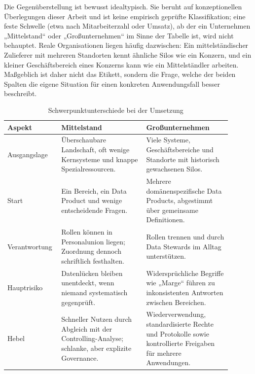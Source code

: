 \documentclass[a4paper,12pt]{article}
\theoremstyle{definition}
\begin{document}
Die Gegenüberstellung ist bewusst idealtypisch. Sie beruht auf konzeptionellen Überlegungen dieser Arbeit und ist keine empirisch geprüfte Klassifikation; eine feste Schwelle (etwa nach Mitarbeiterzahl oder Umsatz), ab der ein Unternehmen „Mittelstand“ oder „Großunternehmen“ im Sinne der Tabelle ist, wird nicht behauptet. Reale Organisationen liegen häufig dazwischen: Ein mittelständischer Zulieferer mit mehreren Standorten kennt ähnliche Silos wie ein Konzern, und ein kleiner Geschäftsbereich eines Konzerns kann wie ein Mittelständler arbeiten. Maßgeblich ist daher nicht das Etikett, sondern die Frage, welche der beiden Spalten die eigene Situation für einen konkreten Anwendungsfall besser beschreibt.

\begin{table}[H]
\centering
\small
\caption{Schwerpunktunterschiede bei der Umsetzung}
\label{tab:company-size}
\begin{tabular}{P{0.18\linewidth}P{0.36\linewidth}P{0.36\linewidth}}
\toprule
\textbf{Aspekt} & \textbf{Mittelstand} & \textbf{Großunternehmen} \\
\midrule
Ausgangslage & Überschaubare Landschaft, oft wenige Kernsysteme und knappe Spezialressourcen. & Viele Systeme, Geschäftsbereiche und Standorte mit historisch gewachsenen Silos. \\
Start & Ein Bereich, ein Data Product und wenige entscheidende Fragen. & Mehrere domänenspezifische Data Products, abgestimmt über gemeinsame Definitionen. \\
Verantwortung & Rollen können in Personalunion liegen; Zuordnung dennoch schriftlich festhalten. & Rollen trennen und durch Data Stewards im Alltag unterstützen. \\
Hauptrisiko & Datenlücken bleiben unentdeckt, wenn niemand systematisch gegenprüft. & Widersprüchliche Begriffe wie „Marge“ führen zu inkonsistenten Antworten zwischen Bereichen. \\
Hebel & Schneller Nutzen durch Abgleich mit der Controlling-Analyse; schlanke, aber explizite Governance. & Wiederverwendung, standardisierte Rechte und Protokolle sowie kontrollierte Freigaben für mehrere Anwendungen. \\
\bottomrule
\end{tabular}
\end{table}
\end{document}
